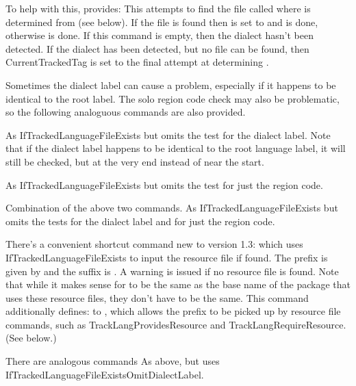 \documentclass[titlepage=false,oneside,
 fontsize=12pt,captions=tableheading]{scrbook}
\begin{document}
\label{pg:filesearch}To help with this,  provides:
This attempts to find the file called
 where  is determined
from  (see below). If the file is found then
is set to  and  is done, otherwise
 is done.  If this command
is empty, then the dialect hasn't been detected. If the dialect
has been detected, but no file can be found, then
\gls{CurrentTrackedTag} is set to the final attempt at determining
.

Sometimes the dialect label can cause a problem, especially if it
happens to be identical to the root label. The solo region code
check may also be problematic, so the following analoguous commands are
also provided.

As \gls{IfTrackedLanguageFileExists} but omits the test for the
dialect label. Note that if the dialect label happens to be
identical to the root language label, it will still be checked, but
at the very end instead of near the start.

As \gls{IfTrackedLanguageFileExists} but omits the test for just the
region code.

Combination of the above two commands.
As \gls{IfTrackedLanguageFileExists} but omits the tests for the
dialect label and for just the region code.

There's a convenient shortcut command new to version 1.3:
which uses \gls{IfTrackedLanguageFileExists} to input the resource
file if found. The prefix is given by \code{-} and
the suffix is . A warning is issued if no resource file
is found. Note that while it makes sense for 
to be the same as the base name of the package that uses these
resource files, they don't have to be the same. This command
additionally defines:
to , which allows the prefix to be picked up by
resource file commands, such as \gls{TrackLangProvidesResource}
and \gls{TrackLangRequireResource}.  (See below.)

There are analogous commands
As above, but uses \gls{IfTrackedLanguageFileExistsOmitDialectLabel}.
\end{document}
